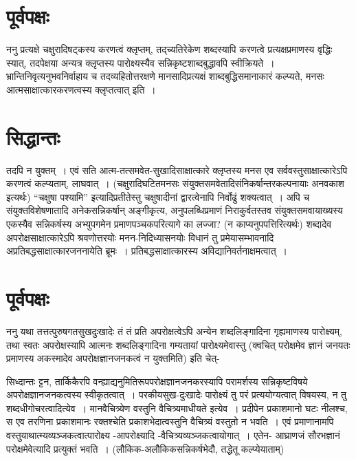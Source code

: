 {\section*{पूर्वपक्षः}

ननु प्रत्यक्षे चक्षुरादिषट्कस्य करणत्वं क्लृप्तम्, तद्च्यतिरेकेण शब्दस्यापि करणत्वे प्रत्यक्षप्रमाणस्य वृद्धिः स्यात्, तदपेक्षया अन्यत्र क्लृप्तस्य पारोक्ष्यस्यैव सन्निकृष्टशाब्दबुद्धावपि स्वीक्रियते~। भ्रान्तिनिवृत्यनुभवनिर्वाहाय च तदव्यहितोत्तरक्षणे मानसादिप्रत्यक्षं शाब्दबुद्धिसमानाकारं कल्प्यते, मनसः आत्मसाक्षात्कारकरणत्वस्य क्लृप्तत्वात् इति~। 

\section*{सिद्धान्तः}

तदपि न युक्तम्~। एवं सति आत्म-तत्समवेत-सुखादिसाक्षात्कारे क्लृप्तस्य मनस एव सर्ववस्तुसाक्षात्कारेऽपि करणत्वं कल्प्यताम्, लाघवात्~। (चक्षुरादिघटितमनसः संयुक्तसमवेतादिसंनिकर्षान्तरकल्पनायाः अनवकाश इत्यर्थः) “चक्षुषा पश्यामि” इत्यादिप्रतीतेस्तु चक्षुषादीनां द्वारत्वेनापि निर्वोढुं शक्यत्वात्~। अपि च संयुक्तविशेषणातादि अनेकसन्निकर्षान् अङ्गीकृत्य, अनुपलब्धिप्रमाणं निराकुर्वतस्तव संयुक्तसमवायाख्यस्य एकस्यैव सन्निकर्षस्य अभ्युपगमेन प्रमाणपञ्चकपरित्यागे का लज्जा? (न काप्यनुपपत्तिरित्यर्थः) शब्दादेव अपरोक्षसाक्षात्कारेऽपि श्रवणोत्तरयोः मनन-निदिध्यासनयोः विधानं तु प्रमेयासम्भावनादि अप्रतिबद्धसाक्षात्कारजननायेति ब्रूमः~। प्रतिबद्धसाक्षात्कारस्य अविद्यानिवर्तनाक्षमत्वात्~। 

\section*{पूर्वपक्षः}

ननु  यथा तत्तत्पुरुषगतसुखदुःखादेः तं तं प्रति अपरोक्षत्वेऽपि अन्येन शब्दलिङ्गादिना गृह्यमाणस्य पारोक्ष्यम्, तथा स्वतः अपरोक्षस्यापि आत्मनः शब्दलिङ्गादिना गम्यतायां पारोक्ष्यमेवास्तु (क्वचित् परोक्षमेव ज्ञानं जनयतः प्रमाणस्य अकस्मादेव अपरोक्षज्ञानजनकत्वं न युक्तमिति) इति चेत्-

सिध्दान्तः ट्टन, तार्किकैरपि वन्ह्याद्यनुमितिरूपपरोक्षज्ञानजनकरस्यापि परामर्शस्य सन्निकृष्टविषये अपरोक्षज्ञानजनकत्वस्य स्वीकृतत्वात्~। परकीयसुख-दुःखादेः पारोक्ष्यं तु परं प्रत्ययोग्यत्वात् विषयस्य, न तु शब्दधीगोचरत्वादित्येव~। मानवैचित्र्येण वस्तुनि वैचित्र्यमाधीयते इत्येव~। प्रदीपेन प्रकाशमानो घटः नीलश्च, स एव तरणिना प्रकाशमानः रक्तश्चेति प्रकाशभेदात्वस्तुनि वैचित्र्यं वस्तुतो न भवति~। एवं प्रमाणानामपि वस्तुयाथात्म्यव्यञ्जकत्वात्पारोक्ष्य -आपरोक्ष्यादि -वैचित्र्यव्यञ्जकत्वायोगात्~। एतेन- आघ्राणजं सौरभज्ञानं परोक्षमेवेत्यादि प्रत्युक्तं भवति~। (लौकिक-अलौकिकसन्निकर्षभेदौ, तद्धेतू कल्प्येयाताम्)

}
